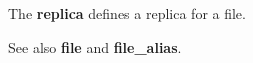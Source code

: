 The \textbf{replica} defines a replica for a file.

See also \textbf{file} and \textbf{file\_alias}.

